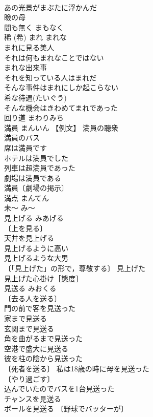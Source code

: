 \documentclass[8pt]{extreport}
\begin{document}
\begin{CJK}{UTF8}{min}
\\	あの光景がまぶたに浮かんだ 
\\	瞼の母 
\\	間も無く	まもなく	
\\	稀 (希)	まれ	まれな 
\\	まれに見る美人 
\\	それは何もまれなことではない 
\\	まれな出来事 
\\	それを知っている人はまれだ 
\\	そんな事件はまれにしか起こらない 
\\	希な待遇(たいぐう) 
\\	そんな機会はきわめてまれであった 
\\	回り道	まわりみち	
\\	満員	まんいん	【例文】 満員の聴衆 
\\	満員のバス 
\\	席は満員です 
\\	ホテルは満員でした 
\\	列車は超満員であった 
\\	劇場は満員である 
\\	満員〔劇場の掲示〕 
\\	満点	まんてん	
\\	未～	み～	
\\	見上げる	みあげる	
\\	〔上を見る〕
\\	天井を見上げる 
\\	見上げるように高い 
\\	見上げるような大男 
\\	〔「見上げた」の形で，尊敬する〕 見上げた 
\\	見上げた心掛け［態度］ 
\\	見送る	みおくる	
\\	〔去る人を送る〕
\\	門の前で客を見送った 
\\	家まで見送る 
\\	玄関まで見送る 
\\	角を曲がるまで見送った 
\\	空港で盛大に見送る 
\\	彼を柱の陰から見送った 
\\	〔死者を送る〕 私は18歳の時に母を見送った 
\\	〔やり過ごす〕
\\	込んでいたのでバスを1台見送った 
\\	チャンスを見送る 
\\	ボールを見送る 〔野球でバッターが〕

\end{CJK}
\end{document}
